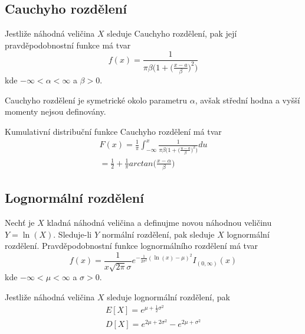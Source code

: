 \subsection{Cauchyho rozdělení}

\begin{definition}
Jestliže náhodná veličina $X$ sleduje Cauchyho rozdělení, pak její pravděpodobnostní funkce má tvar
\begin{equation*}
f(x) = \frac{1}{\pi \beta \big(1 + \big(\frac{x - a}{\beta} \big)^2 \big)}
\end{equation*}
kde $-\infty < \alpha < \infty$ a $\beta > 0$.
\end{definition}
Cauchyho rozdělení je symetrické okolo parametru $\alpha$, avšak střední hodna a vyšší momenty nejsou definovány.

\begin{theorem}
Kumulativní distribuční funkce Cauchyho rozdělení má tvar
\begin{gather*}
F(x) = \frac{1}{\pi} \int_{-\infty}^x \frac{1}{\pi \beta \big(1 + \big(\frac{u - a}{\beta}\big)^2 \big)}du\\
= \frac{1}{2} + \frac{1}{\pi}arctan \Big( \frac{x - \alpha}{\beta}\Big)
\end{gather*}
\end{theorem}

\subsection{Lognormální rozdělení}

\begin{definition}
Nechť je $X$ kladná náhodná veličina a definujme novou náhodnou veličinu $Y = \ln(X)$. Sleduje-li $Y$ normální rozdělení, pak sleduje $X$ lognormální rozdělení. Pravděpodobnostní funkce lognormálního rozdělení má tvar
\begin{equation*}
f(x) = \frac{1}{x \sqrt{2 \pi} \sigma}e^{-\frac{1}{2 \sigma^2}(\ln(x) - \mu)^2}I_{(0, \infty)}(x)
\end{equation*}
kde $-\infty < \mu < \infty$ a $\sigma > 0$.
\end{definition}

\begin{theorem}
Jestliže náhodná veličina $X$ sleduje lognormální rozdělení, pak
\begin{gather*}
E[X] = e^{\mu + \frac{1}{2}\sigma^2}\\
D[X] = e^{2 \mu + 2 \sigma^2} - e^{2\mu + \sigma^2}
\end{gather*}
\end{theorem}

